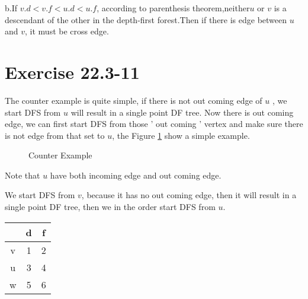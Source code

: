 \documentclass[oneside]{homework} %
\begin{document}
b.If $\mathit{v}.d < \mathit{v}.f <\mathit{u}.d < \mathit{u}.f$, according to parenthesis theorem,neither$\mathit{u}$ or $\mathit{v}$ is a descendant of the other in the depth-first forest.Then if there is edge between $\mathit{u}$ and $\mathit{v}$, it must be cross edge.

\section{Exercise 22.3-11}
The counter example is quite simple, if there is not out coming edge of $\mathit{u}$ , we start DFS from $\mathit{u}$ will result in a single point DF tree. Now there is out coming edge, we can first start DFS from those ' out coming ' vertex and make sure there is not edge from that set to $\mathit{u}$, the Figure \ref{fig:ce1} show a simple example.

\begin{figure}[h]
  \centering
  \caption{Counter Example}
  \label{fig:ce1}
\end{figure}

Note that $\mathit{u}$ have both incoming edge and out coming edge. 

We start DFS from $\mathit{v}$, because it has no out coming edge, then it will result in a single point DF tree, then we in the order start DFS from $\mathit{u}$.
\begin{center}
  \begin{tabular}[h]{c|c|c|}
	& d & f  \\
	\hline
	v & 1 & 2  \\
	\hline
	u & 3 & 4  \\
	\hline
	w & 5 & 6  \\
  \end{tabular}
\end{center}
\end{document}
